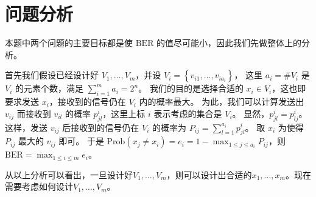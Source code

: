 \section{问题分析}

本题中两个问题的主要目标都是使 \(\mathrm{BER}\) 的值尽可能小，因此我们先做整体上的分析。

首先我们假设已经设计好 \(V_1,\dots,V_m\)，并设 \(V_i=\left\{v_{i1},\dots,v_{ia_i}\right\}\)，
这里 \(a_i=\#V_i\) 是 \(V_i\) 的元素个数，满足 \(\sum_{i=1}^m a_i=2^n\)。
我们的目的是选择合适的 \(x_i\in V_i\)，这也即要求发送 \(x_i\)，接收到的信号仍在 \(V_i\) 内的概率最大。
为此，我们可以计算发送出 \(v_{ij}\) 而接收到 \(v_{il}\) 的概率 \(p^i_{jl}\)，这里上标 \(i\) 表示考虑的集合是 \(V_i\)。
显然，\(p^i_{jl}=p^i_{lj}\)。
这样，发送 \(v_{ij}\) 后接收到的信号仍在 \(V_i\) 的概率为 \(P_{ij}=\sum_{l=1}^{a_i}p^i_{jl}\)。
取 \(x_i\) 为使得 \(P_{ij}\) 最大的 \(v_{ij}\) 即可。
于是 \(\mathrm{Prob}\left(x_j\ne x_i\right)=e_i=1-\max_{1\le j\le a_i}P_{ij}\)，则 \(\mathrm{BER}=\max_{1\le i\le m}e_i\)。

从以上分析可以看出，一旦设计好$V_1,\dots,V_m$，则可以设计出合适的$x_1,\dots,x_m$。现在需要考虑如何设计$V_1,\dots,V_m$。
